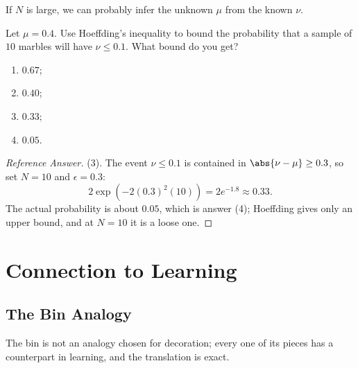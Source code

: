 \begin{moral}
    If \(N\) is large, we can probably infer the unknown \(\mu\) from the known
    \(\nu\).
\end{moral}

\begin{exercise}
    Let \(\mu = 0.4\). Use Hoeffding's inequality to bound the probability that
    a sample of \(10\) marbles will have \(\nu \le 0.1\). What bound do you get?
    \begin{enumerate}[(1)]
        \item \(0.67\);
        \item \(0.40\);
        \item \(0.33\);
        \item \(0.05\).
    \end{enumerate}
\end{exercise}

\begin{proof}[Reference Answer]
    (3). The event \(\nu \le 0.1\) is contained in \(\abs{\nu - \mu} \ge 0.3\),
    so set \(N = 10\) and \(\epsilon = 0.3\):
    \[
        2 \exp \left( -2 (0.3)^2 (10) \right) = 2 e^{-1.8} \approx 0.33 .
    \]
    The actual probability is about \(0.05\), which is answer (4); Hoeffding
    gives only an upper bound, and at \(N = 10\) it is a loose one.
\end{proof}

\section{Connection to Learning}\label{sec:bin-learning}


\subsection{The Bin Analogy}

The bin is not an analogy chosen for decoration; every one of its pieces has a
counterpart in learning, and the translation is exact.

